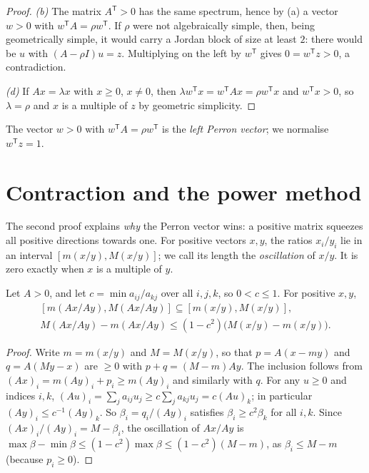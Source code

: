 \begin{proof}
\emph{(b)} The matrix $A^{\mathsf T}>0$ has the same spectrum, hence by (a) a vector $w>0$ with $w^{\mathsf T}A=\rho w^{\mathsf
T}$. If $\rho$ were not algebraically simple, then, being geometrically simple, it would carry a Jordan block of size at least
$2$: there would be $u$ with $(A-\rho I)u=z$. Multiplying on the left by $w^{\mathsf T}$ gives $0=w^{\mathsf T}z>0$, a
contradiction.

\emph{(d)} If $Ax=\lambda x$ with $x\ge0$, $x\ne0$, then $\lambda w^{\mathsf T}x=w^{\mathsf T}Ax=\rho w^{\mathsf T}x$ and $w^{\mathsf
T}x>0$, so $\lambda=\rho$ and $x$ is a multiple of $z$ by geometric simplicity.
\end{proof}

The vector $w>0$ with $w^{\mathsf T}A=\rho w^{\mathsf T}$ is the \emph{left Perron vector}; we normalise $w^{\mathsf T}z=1$.

\section{Contraction and the power method}

The second proof explains \emph{why} the Perron vector wins: a positive matrix squeezes all positive directions towards one.
For positive vectors $x,y$, the ratios $x_i/y_i$ lie in an interval $[m(x/y),M(x/y)]$; we call its length the
\emph{oscillation} of $x/y$. It is zero exactly when $x$ is a multiple of $y$.

\begin{lemma}\label{linear:lem:oscillation}
Let $A>0$, and let $c=\min a_{ij}/a_{kj}$ over all $i,j,k$, so $0<c\le1$. For positive $x,y$,
\[
\begin{gathered}
[m(Ax/Ay),M(Ax/Ay)]\subseteq[m(x/y),M(x/y)],\\
M(Ax/Ay)-m(Ax/Ay)\le(1-c^2)\bigl(M(x/y)-m(x/y)\bigr).
\end{gathered}
\]
\end{lemma}
\begin{proof}
Write $m=m(x/y)$ and $M=M(x/y)$, so that $p=A(x-my)$ and $q=A(My-x)$ are $\ge0$ with $p+q=(M-m)Ay$. The inclusion follows from
$(Ax)_i=m(Ay)_i+p_i\ge m(Ay)_i$ and similarly with $q$. For any $u\ge0$ and indices $i,k$, $(Au)_i=\sum_ja_{ij}u_j\ge c\sum_j
a_{kj}u_j=c(Au)_k$; in particular $(Ay)_i\le c^{-1}(Ay)_k$. So $\beta_i=q_i/(Ay)_i$ satisfies $\beta_i\ge c^2\beta_k$ for all
$i,k$. Since $(Ax)_i/(Ay)_i=M-\beta_i$, the oscillation of $Ax/Ay$ is $\max\beta-\min\beta\le(1-c^2)\max\beta\le(1-c^2)(M-m)$,
as $\beta_i\le M-m$ (because $p_i\ge0$).
\end{proof}

